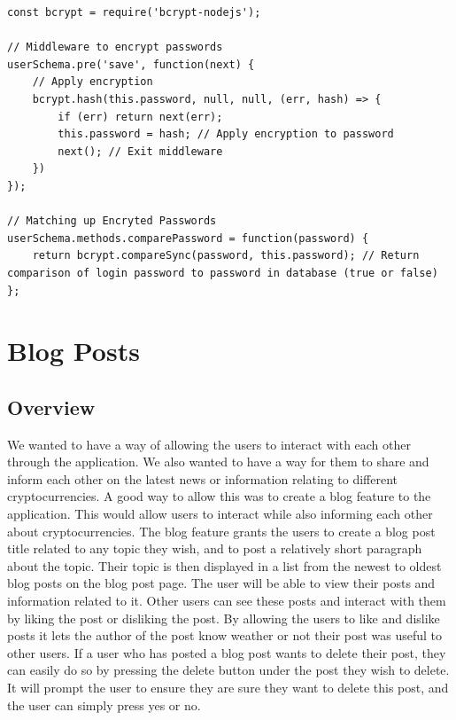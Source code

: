 \begin{lstlisting}
const bcrypt = require('bcrypt-nodejs');

// Middleware to encrypt passwords
userSchema.pre('save', function(next) {
    // Apply encryption
    bcrypt.hash(this.password, null, null, (err, hash) => {
        if (err) return next(err);
        this.password = hash; // Apply encryption to password
        next(); // Exit middleware
    })
});

// Matching up Encryted Passwords
userSchema.methods.comparePassword = function(password) {
    return bcrypt.compareSync(password, this.password); // Return comparison of login password to password in database (true or false)
};
\end{lstlisting}

\section{Blog Posts}

\subsection{Overview}
We wanted to have a way of allowing the users to interact with each other through the application. We also wanted to have a way for them to share and inform each other on the latest news or information relating to different cryptocurrencies. A good way to allow this was to create a blog feature to the application. This would allow users to interact while also informing each other about cryptocurrencies. The blog feature grants the users to create a blog post title related to any topic they wish, and to post a relatively short paragraph about the topic. Their topic is then displayed in a list from the newest to oldest blog posts on the blog post page. The user will be able to view their posts and information related to it. Other users can see these posts and interact with them by liking the post or disliking the post. By allowing the users to like and dislike posts it lets the author of the post know weather or not their post was useful to other users. If a user who has posted a blog post wants to delete their post, they can easily do so by pressing the delete button under the post they wish to delete. It will prompt the user to ensure they are sure they want to delete this post, and the user can simply press yes or no.

